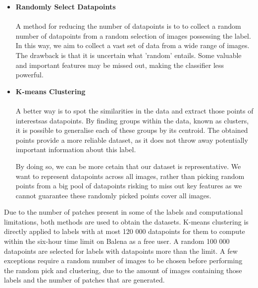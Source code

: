 \begin{itemize}
  \item \textbf{Randomly Select Datapoints} \\ \\
A method for reducing the number of datapoints is to to collect a random number of datapoints from a random selection of images possessing the label. In this way, we aim to collect a vast set of data from a wide range of images. The drawback is that it is uncertain what 'random' entails. Some valuable and important features may be missed out, making the classifier less powerful. \\
  
  \item \textbf{K-means Clustering} \\ \\
A better way is to spot the similarities in the data and extract those points of interestsas datapoints. By finding groups within the data, known as clusters, it is possible to generalise each of these groups by its centroid. The obtained points provide a more reliable dataset, as it does not throw away potentially important information about this label.

By doing so, we can be more cetain that our dataset is representative. We want to represent datapoints across all images, rather than picking random points from a big pool of datapoints risking to miss out key features as we cannot guarantee these randomly picked points cover all images.
\end{itemize}



Due to the number of patches present in some of the labels and computational limitations, both methods are used to obtain the datasets. K-means clustering is directly applied to labels with at most 120 000 datapoints for them to compute within the six-hour time limit on Balena as a free user. A random 100 000 datapoints are selected for labels with datapoints more than the limit. A few exceptions require a random number of images to be chosen before performing the random pick and clustering, due to the amount of images containing those labels and the number of patches that are generated. 

